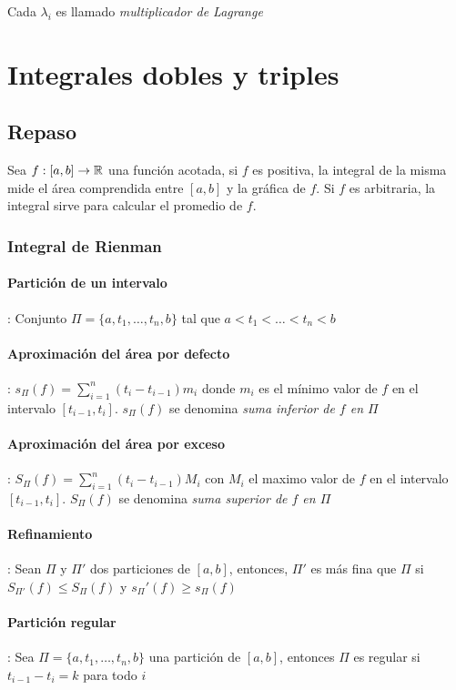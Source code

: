 Cada $\lambda_i$ es llamado \textit{multiplicador de Lagrange}

\newpage
\section{Integrales dobles y triples}
\subsection{Repaso}
Sea $f:[a,b]\to\mathbb{R}$ una función acotada, si $f$ es positiva, la integral de la misma mide el área comprendida entre $[a,b]$ y la gráfica de $f$. Si $f$ es arbitraria, la integral sirve para calcular el promedio de $f$.
\subsubsection{Integral de Rienman}
\paragraph{Partición de un intervalo}: Conjunto $\Pi = \{a, t_1, \dots, t_n, b\}$ tal que $a < t_1 < \dots < t_n < b$

\paragraph{Aproximación del área por defecto}: $s_\Pi(f) = \sum_{i=1}^{n} (t_i-t_{i-1})m_i$ donde $m_i$ es el mínimo valor de $f$ en el intervalo $[t_{i-1},t_i]$. $s_\Pi(f)$ se denomina \textit{suma inferior de $f$ en $\Pi$}

\paragraph{Aproximación del área por exceso}: $S_\Pi(f) = \sum_{i=1}^{n} (t_i-t_{i-1})M_i$ con $M_i$ el maximo valor de $f$ en el intervalo $[t_{i-1},t_i]$. $S_\Pi(f)$ se denomina \textit{suma superior de $f$ en $\Pi$}

\paragraph{Refinamiento}: Sean $\Pi$ y $\Pi'$ dos particiones de $[a,b]$, entonces, $\Pi'$ es más fina que $\Pi$ si $S_{\Pi'}(f) \leq S_{\Pi}(f)$ y $s_\Pi'(f) \geq s_\Pi(f)$

\paragraph{Partición regular}: Sea $\Pi = \{a, t_1, \dots, t_n, b\}$ una partición de $[a,b]$, entonces $\Pi$ es regular si $t_{i-1} - t_{i} = k$ para todo $i$

